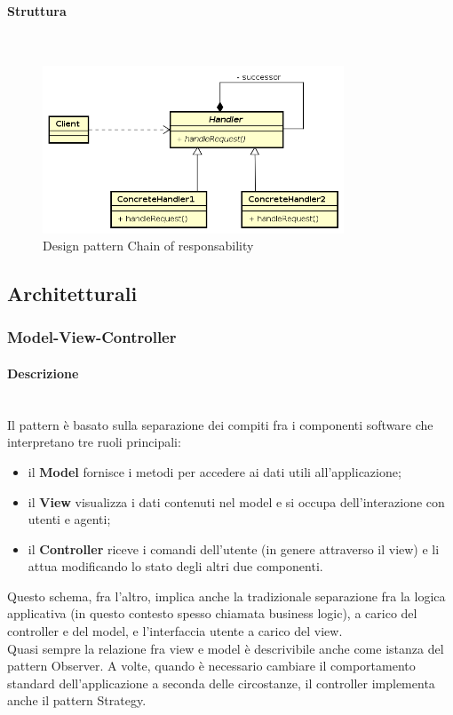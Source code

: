 \paragraph{Struttura} \mbox{} \\
\begin{figure}[H]
\centering
\includegraphics[width=0.8\textwidth]{res/sections/backend/chainOfResponsability.png}
\caption{Design pattern Chain of responsability}
\end{figure}
\subsection{Architetturali}
\subsubsection{Model-View-Controller}
\paragraph{Descrizione} \mbox{} \\
Il pattern è basato sulla separazione dei compiti fra i componenti software che interpretano tre ruoli principali:
\begin{itemize}
\item il \textbf{Model} fornisce i metodi per accedere ai dati utili all'applicazione;
\item il \textbf{View} visualizza i dati contenuti nel model e si occupa dell'interazione con utenti e agenti;
\item il \textbf{Controller} riceve i comandi dell'utente (in genere attraverso il view) e li attua modificando lo stato degli altri due componenti.
\end{itemize}
Questo schema, fra l'altro, implica anche la tradizionale separazione fra la logica applicativa (in questo contesto spesso chiamata business logic), a carico del controller e del model, e l'interfaccia utente a carico del view. \\
Quasi sempre la relazione fra view e model è descrivibile anche come istanza del pattern Observer. A volte, quando è necessario cambiare il comportamento standard dell'applicazione a seconda delle circostanze, il controller implementa anche il pattern Strategy.
